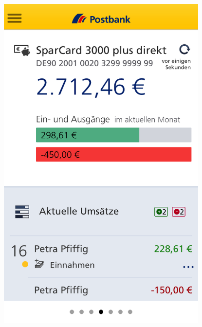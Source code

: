 \begin{figure}[H] 
    \begin{minipage}[b]{.5\linewidth}
        \centering\includegraphics[width=0.94\textwidth]{img/screenshots/ex3p5.png}
    \end{minipage}%
    \begin{minipage}[b]{.5\linewidth}

\end{minipage}
\end{figure}
